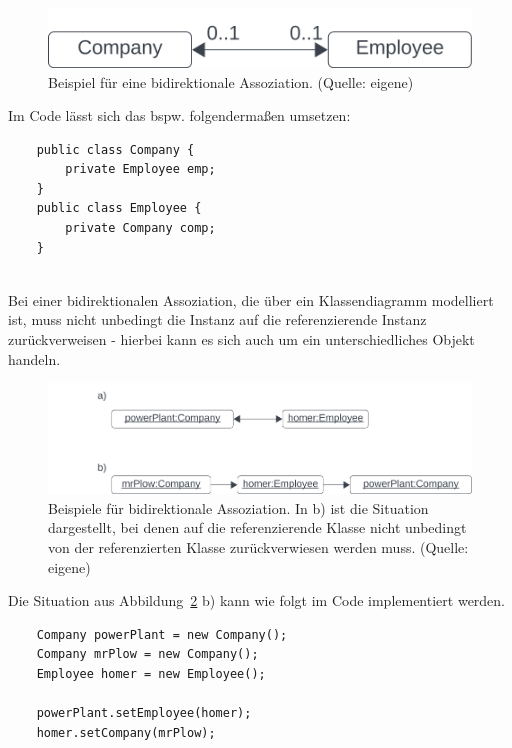 \begin{figure}
    \centering
    \includegraphics[scale=0.5]{chapters/fopt3/img/bidirectionalassociation}
    \caption{Beispiel für eine bidirektionale Assoziation. (Quelle: eigene)}
    \label{fig:bidirectionalassociation}
\end{figure}

Im Code lässt sich das bspw. folgendermaßen umsetzen:
\newpage

\begin{verbatim}
    public class Company {
        private Employee emp;
    }
    public class Employee {
        private Company comp;
    }
\end{verbatim}\\

\noindent
    Bei einer bidirektionalen Assoziation, die über ein Klassendiagramm modelliert ist, muss nicht unbedingt die Instanz auf die referenzierende Instanz zurückverweisen - hierbei kann es sich auch um ein unterschiedliches Objekt handeln.\\

\begin{figure}
    \centering
    \includegraphics[scale=0.5]{chapters/fopt3/img/bidirectionalassocexample}
    \caption{Beispiele für bidirektionale Assoziation. In b) ist die Situation dargestellt, bei denen auf die referenzierende Klasse nicht unbedingt von der referenzierten Klasse zurückverwiesen werden muss. (Quelle: eigene)}
    \label{fig:bidirectionalassocexample}
\end{figure}

Die Situation aus Abbildung~\ref{fig:bidirectionalassocexample} b) kann wie folgt im Code implementiert werden.

\begin{verbatim}
    Company powerPlant = new Company();
    Company mrPlow = new Company();
    Employee homer = new Employee();

    powerPlant.setEmployee(homer);
    homer.setCompany(mrPlow);
\end{verbatim}\\

